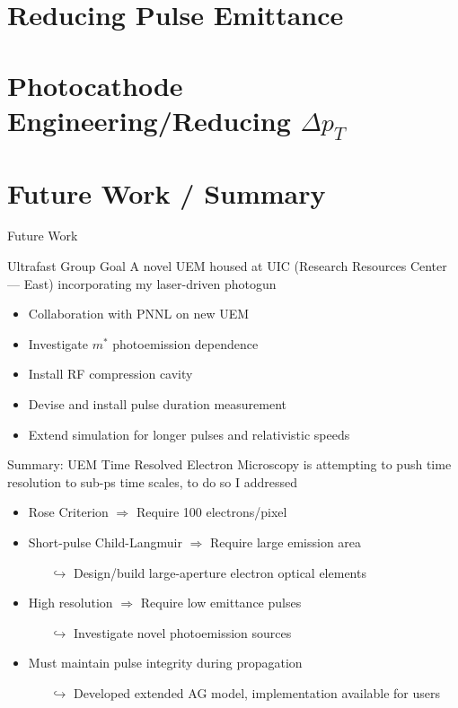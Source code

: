 \documentclass[mathserif]{beamer}
\providecommand{\smallT}[0]{ { \scriptscriptstyle T } }
\begin{document}
\section{Reducing Pulse Emittance}


\section{Photocathode Engineering/Reducing $\Delta p_{\smallT}$}


\section{Future Work / Summary}

\begin{frame}{Future Work}
  \begin{block}{Ultrafast Group Goal}
    A novel UEM housed at UIC (Research Resources Center --- East) incorporating my laser-driven photogun
  \end{block}
  \begin{itemize}
    \item<2-> Collaboration with PNNL on new UEM 
    \item<3-> Investigate $m^{*}$ photoemission dependence
    \item<4-> Install RF compression cavity
    \item<5-> Devise and install pulse duration measurement
    \item<6-> Extend simulation for longer pulses and relativistic speeds
  \end{itemize}
\end{frame}

\begin{frame}{Summary: UEM}
Time Resolved Electron Microscopy is attempting to push time resolution to sub-ps time scales, to do so I addressed
\begin{itemize}
  \item Rose Criterion $\Rightarrow$ Require 100 electrons/pixel
  \item Short-pulse Child-Langmuir $\Rightarrow$ Require large emission area
  \begin{itemize}
    \item[$\hookrightarrow$] Design/build large-aperture electron optical elements
  \end{itemize}
  \item High resolution $\Rightarrow$ Require low emittance pulses
  \begin{itemize}
    \item[$\hookrightarrow$] Investigate novel photoemission sources
  \end{itemize}
  \item Must maintain pulse integrity during propagation
  \begin{itemize}
    \item[$\hookrightarrow$] Developed extended AG model, implementation available for users
  \end{itemize}
\end{itemize}
\end{frame}
\end{document}
